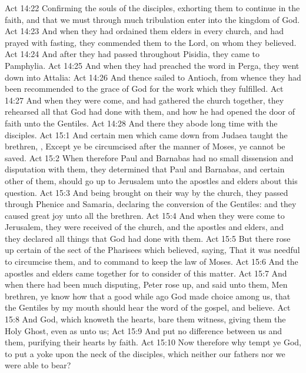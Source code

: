 \vs Act 14:22 Confirming the souls of the disciples,  exhorting them to continue in the faith, and that we must through much tribulation enter into the kingdom of God.
\vs Act 14:23 And when they had ordained them elders in every church, and had prayed with fasting, they commended them to the Lord, on whom they believed.
\vs Act 14:24 And after they had passed throughout Pisidia, they came to Pamphylia.
\vs Act 14:25 And when they had preached the word in Perga, they went down into Attalia:
\vs Act 14:26 And thence sailed to Antioch, from whence they had been recommended to the grace of God for the work which they fulfilled.
\vs Act 14:27 And when they were come, and had gathered the church together, they rehearsed all that God had done with them, and how he had opened the door of faith unto the Gentiles.
\vs Act 14:28 And there they abode long time with the disciples.
\vs Act 15:1 And certain men which came down from Judaea taught the brethren, , Except ye be circumcised after the manner of Moses, ye cannot be saved.
\vs Act 15:2 When therefore Paul and Barnabas had no small dissension and disputation with them, they determined that Paul and Barnabas, and certain other of them, should go up to Jerusalem unto the apostles and elders about this question.
\vs Act 15:3 And being brought on their way by the church, they passed through Phenice and Samaria, declaring the conversion of the Gentiles: and they caused great joy unto all the brethren.
\vs Act 15:4 And when they were come to Jerusalem, they were received of the church, and  the apostles and elders, and they declared all things that God had done with them.
\vs Act 15:5 But there rose up certain of the sect of the Pharisees which believed, saying, That it was needful to circumcise them, and to command  to keep the law of Moses.
\vs Act 15:6 And the apostles and elders came together for to consider of this matter.
\vs Act 15:7 And when there had been much disputing, Peter rose up, and said unto them, Men  brethren, ye know how that a good while ago God made choice among us, that the Gentiles by my mouth should hear the word of the gospel, and believe.
\vs Act 15:8 And God, which knoweth the hearts, bare them witness, giving them the Holy Ghost, even as  unto us;
\vs Act 15:9 And put no difference between us and them, purifying their hearts by faith.
\vs Act 15:10 Now therefore why tempt ye God, to put a yoke upon the neck of the disciples, which neither our fathers nor we were able to bear?
